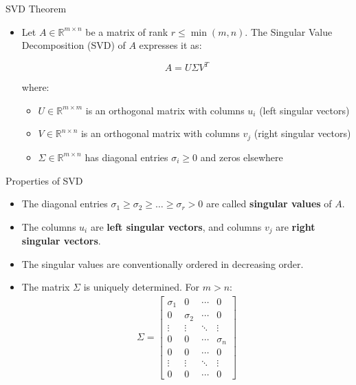 
\begin{frame}{SVD Theorem}
\begin{itemize}
    \item Let \( A \in \mathbb{R}^{m \times n} \) be a matrix of rank \( r \leq \min(m, n) \). The Singular Value Decomposition (SVD) of \( A \) expresses it as:

\[
A = U \Sigma V^T
\]

where:
\begin{itemize}
    \item \( U \in \mathbb{R}^{m \times m} \) is an orthogonal matrix with columns \( u_i \) (left singular vectors)
    \item \( V \in \mathbb{R}^{n \times n} \) is an orthogonal matrix with columns \( v_j \) (right singular vectors)
    \item \( \Sigma \in \mathbb{R}^{m \times n} \) has diagonal entries \( \sigma_i \geq 0 \) and zeros elsewhere
\end{itemize}
\end{itemize}
\end{frame}

\begin{frame}{Properties of SVD}
\begin{itemize}
    \item The diagonal entries $\sigma_1 \geq \sigma_2 \geq \ldots \geq \sigma_r > 0$ are called \textbf{singular values} of $A$.
    \item The columns $u_i$ are \textbf{left singular vectors}, and columns $v_j$ are \textbf{right singular vectors}.
    \item The singular values are conventionally ordered in decreasing order.
    \item The matrix $\Sigma$ is uniquely determined. For $m > n$:
    \begin{align}
        \Sigma = \begin{bmatrix}
            \sigma_1 & 0 & \cdots & 0 \\
            0 & \sigma_2 & \cdots & 0 \\
            \vdots & \vdots & \ddots & \vdots \\
            0 & 0 & \cdots & \sigma_n \\
            0 & 0 & \cdots & 0 \\
            \vdots & \vdots & \ddots & \vdots \\
            0 & 0 & \cdots & 0
        \end{bmatrix}
    \end{align}
\end{itemize}
\end{frame}


